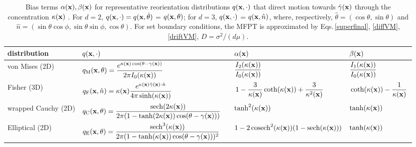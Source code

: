 \documentclass[
 reprint,










 amsmath,amssymb,
 aps, prl,






longbibliography
]{revtex4-2}
\DeclareMathOperator{\sech}{sech}
\DeclareMathOperator{\cosech}{cosech}
\begin{document}
\begin{table}[t]
\renewcommand{\arraystretch}{2.3}
\caption{\label{table1}
Bias terms $\alpha({\bf x}), \beta(\bf x)$ for representative reorientation distributions $q({\bf x}, \cdot)$ that direct motion towards
    $\hat \gamma(\bf x)$ through the concentration $\kappa(\bf{x})$ \cite{Wu2000}.
    For $d=2$, $q({\bf x}, \cdot) = q({\bf x}, \hat \theta)$ = $q({\bf x}, \theta)$; for $d=3$, $q({\bf x}, \cdot)$ = $q({\bf x}, \hat n)$,
    where, respectively,  $\hat \theta =(\cos \theta, \sin \theta)$ and
    $\hat n = (\sin \theta \cos \phi,  \sin \theta \sin \phi, \cos \theta)$.
    For set boundary conditions, the MFPT is approximated by Eqs.\,\ref{superfinal}, \ref{diffVM}, \ref{driftVM},
    $D = \sigma^2 / (d \mu)$.}
\begin{ruledtabular}
\begin{tabular}{llll}
 distribution &  $q({\bf {x}}, \cdot)$ & $\alpha({\bf {x}})$  & $\beta({\bf {x}})$
 \\[1ex]
 \hline
       von Mises (2D) & $q_{\rm M}({\bf {x}}, \theta) = \displaystyle{\frac{e^{\kappa ({{\bf {x}}}) \cos (\theta - \gamma({\bf {x}}))}}{2 \pi I_0(\kappa ({\bf {x}}))}}$
       & $ \displaystyle{\frac{I_2(\kappa ({\bf {x}}))}
{I_0(\kappa ({\bf {x}}))}} $ & $ \displaystyle{ \frac{I_1(\kappa ({\bf {x}}))}
{I_0(\kappa ({\bf {x}}))}}$
  \\[1ex]
\hline
 Fisher (3D) &
$q_{\rm F}({\bf {x}}, \hat{n}) = \kappa({\bf {x}}) \displaystyle{\frac
{e^{\kappa ({{\bf {x}}}) \hat \gamma({\bf {x}}) \cdot \hat n}}
{4 \pi \sinh(\kappa ({\bf {x}}))}}$  & $ \, \displaystyle{ 1 - \frac 3 {\kappa({\bf {x}})} \coth(\kappa({\bf {x}}))+  \frac 3 {\kappa^2({\bf {x}})} \, }
 $ & $ \, \displaystyle{\coth(\kappa({\bf {x}})) -  \frac 1 {\kappa({\bf {x}})} } \,$
  \\[1ex]
\hline
wrapped Cauchy (2D) & $q_{\rm C}({\bf {x}}, \theta) = \displaystyle{\frac{\sech
(2  \kappa({\bf x}))}
{2 \pi (1 - \tanh(2 \kappa({\bf {x}}))  \cos(\theta - \gamma({\bf {x}}))) } }$ &
 $\displaystyle{\tanh^2(\kappa({\bf {x}}))}$ & $\tanh(\kappa(\bf {x}))$
 \\[1ex]
\hline
Elliptical (2D) & $q_{\rm E}( {\bf {x}}, \theta) =
\displaystyle{\frac{\sech^{3}
( \kappa({\bf x}))
}
{2 \pi (1 - \tanh(\kappa({\bf x}))  \cos(\theta - \gamma({\bf x})))^2}} \quad$
& $1 - 2 \cosech^2  (\kappa({\bf x})) (1 - \sech (\kappa(\bf x)))$ \quad
 & $ \tanh (\kappa({\bf x}))$

 \\[1ex]
\end{tabular}
\end{ruledtabular}
\label{distributions}
\end{table}
\end{document}
